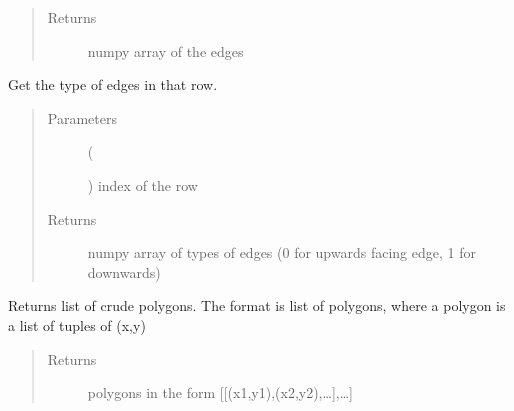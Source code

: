 \documentclass[a4paper,10pt,english]{sphinxmanual}
\begin{document}
\begin{fulllineitems}
\begin{fulllineitems}
\begin{quote}
\begin{description}
\item[{Returns}] \leavevmode
numpy array of the edges

\end{description}\end{quote}

\end{fulllineitems}


\begin{fulllineitems}
\label{\detokenize{drc/drc:kppc.drc.kppc.drc.slcleaner.PyDrcSl.get_row_types}}
Get the type of edges in that row.
\begin{quote}\begin{description}
\item[{Parameters}] \leavevmode
{} (%
\begin{footnote}[17]\sphinxAtStartFootnote
{}
%
\end{footnote}) \textendash{} index of the row

\item[{Returns}] \leavevmode
numpy array of types of edges (0 for upwards facing edge, 1 for downwards)

\end{description}\end{quote}

\end{fulllineitems}


\begin{fulllineitems}
\label{\detokenize{drc/drc:kppc.drc.kppc.drc.slcleaner.PyDrcSl.polygons}}
Returns list of crude polygons. The format is list of polygons, where a polygon is a list of tuples of (x,y)
\begin{quote}\begin{description}
\item[{Returns}] \leavevmode
polygons in the form {[}{[}(x1,y1),(x2,y2),…{]},…{]}


\end{description}
\end{quote}
\end{fulllineitems}
\end{fulllineitems}
\end{document}
